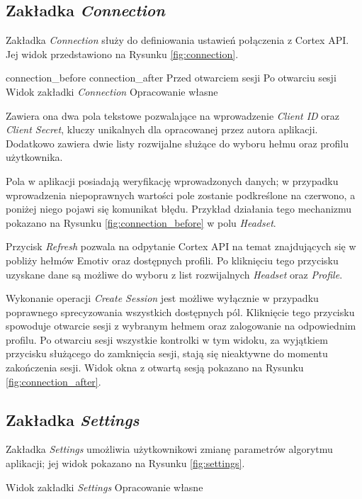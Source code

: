 \documentclass[skorowidz,skroty]{dyplomWEZUT}
\begin{document}
\subsection{Zakładka \textit{Connection}}
Zakładka \textit{Connection} służy do definiowania ustawień połączenia z Cortex API. Jej widok przedstawiono na Rysunku \vref{fig:connection}.

\rysunektwo
{connection_before}
{connection_after}
{Przed otwarciem sesji\label{fig:connection_before}}
{Po otwarciu sesji\label{fig:connection_after}}
{Widok zakładki \textit{Connection}\label{fig:connection}}
{Opracowanie własne}

Zawiera ona dwa pola tekstowe pozwalające na wprowadzenie \textit{Client ID} oraz \textit{Client Secret}, kluczy unikalnych dla opracowanej przez autora aplikacji. Dodatkowo zawiera dwie listy rozwijalne służące do wyboru hełmu oraz profilu użytkownika.

Pola w aplikacji posiadają weryfikację wprowadzonych danych; w przypadku wprowadzenia niepoprawnych wartości pole zostanie podkreślone na czerwono, a poniżej niego pojawi się komunikat błędu. Przykład działania tego mechanizmu pokazano na Rysunku \vref{fig:connection_before} w polu \textit{Headset}.

Przycisk \textit{Refresh} pozwala na odpytanie Cortex API na temat znajdujących się w pobliży hełmów Emotiv oraz dostępnych profili. Po kliknięciu tego przycisku uzyskane dane są możliwe do wyboru z list rozwijalnych \textit{Headset} oraz \textit{Profile}.

Wykonanie operacji \textit{Create Session} jest możliwe wyłącznie w przypadku poprawnego sprecyzowania wszystkich dostępnych pól. Kliknięcie tego przycisku spowoduje otwarcie sesji z wybranym hełmem oraz zalogowanie na odpowiednim profilu. Po otwarciu sesji wszystkie kontrolki w tym widoku, za wyjątkiem przycisku służącego do zamknięcia sesji, stają się nieaktywne do momentu zakończenia sesji. Widok okna z otwartą sesją pokazano na Rysunku \vref{fig:connection_after}.


\subsection{Zakładka \textit{Settings}}
Zakładka \textit{Settings} umożliwia użytkownikowi zmianę parametrów algorytmu aplikacji; jej widok pokazano na Rysunku \vref{fig:settings}.

{Widok zakładki \textit{Settings}\label{fig:settings}}
{Opracowanie własne}
\end{document}

